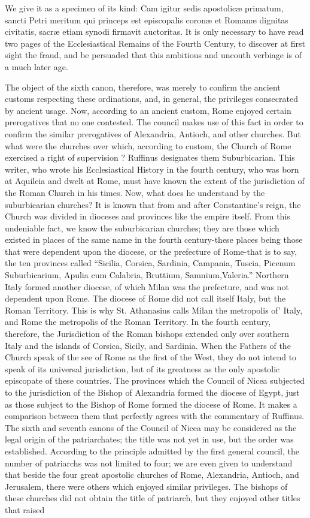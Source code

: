 We give it as a specimen of its kind: Cam igitur sedis apostolicæ primatum, sancti Petri meritum qui princeps est episcopalis coronæ et Romanæ dignitas civitatis, sacræ etiam synodi firmavit auctoritas. It is only necessary to have read two pages of the Ecclesiastical Remains of the Fourth Century, to discover at first sight the fraud, and be persuaded that this ambitious and uncouth verbiage is of a much later age.

The object of the sixth canon, therefore, was merely to confirm the ancient customs respecting these ordinations, and, in general, the privileges consecrated by ancient usage. Now, according to an ancient custom, Rome enjoyed certain prerogatives that no one contested. The council makes use of this fact in order to confirm the similar prerogatives of Alexandria, Antioch, and other churches. But what were the churches over which, according to custom, the Church of Rome exercised a right of supervision ? Ruffinus designates them Suburbicarian. This writer, who wrote his Ecclesiastical History in the fourth century, who was born at Aquileia and dwelt at Rome, must have known the extent of the jurisdiction of the Roman Church in his times. Now, what does he understand by the suburbicarian churches? It is known that from and after Constantine’s reign, the Church was divided in dioceses and provinces like the empire itself. From this undeniable fact, we know the suburbicarian churches; they are those which existed in places of the same name in the fourth century-these places being those that were dependent upon the diocese, or the prefecture of Rome-that is to say, the ten provinces called “Sicilia, Corsica, Sardinia, Campania, Tuscia, Picenum Suburbicarium, Apulia cum Calabria, Bruttium, Samnium,Valeria.” Northern Italy formed another diocese, of which Milan was the prefecture, and was not dependent upon Rome. The diocese of Rome did not call itself Italy, but the Roman Territory. This is why St. Athanasius calls Milan the metropolis of' Italy, and Rome the metropolis of the Roman Territory. In the fourth century, therefore, the Jurisdiction of the Roman bishops extended only over southern Italy and the islands of Corsica, Sicily, and Sardinia. When the Fathers of the Church speak of the see of Rome as the first of the West, they do not intend to speak of its universal jurisdiction, but of its greatness as the only apostolic episcopate of these countries. The provinces which the Council of Nicea subjected to the jurisdiction of the Bishop of Alexandria formed the diocese of Egypt, just as those subject to the Bishop of Rome formed the diocese of Rome. It makes a comparison between them that perfectly agrees with the commentary of Ruffinus. The sixth and seventh canons of the Council of Nicea may be considered as the legal origin of the patriarchates; the title was not yet in use, but the order was established. According to the principle admitted by the first general council, the number of patriarchs was not limited to four; we are even given to understand that beside the four great apostolic churches of Rome, Alexandria, Antioch, and Jerusalem, there were others which enjoyed similar privileges. The bishops of these churches did not obtain the title of patriarch, but they enjoyed other titles that raised 